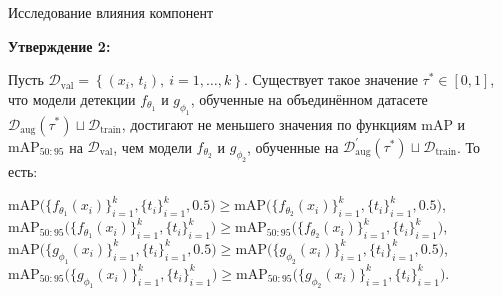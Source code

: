 \documentclass{beamer}
\begin{document}
\begin{frame}{Исследование влияния компонент}

\textbf{Утверждение 2:}\par

Пусть $\mathcal{D}_{\text{val}} =
\left\{
  (x_i,\,t_i), \
  i = 1,\dots,k
\right\}$. Существует такое значение $\tau^*\in[0,1]$, что модели детекции $f_{\theta_1}$ и $g_{\phi_1}$, обученные на объединённом датасете $\mathcal{D}_{\mathrm{aug}}(\tau^*)\sqcup\mathcal{D}_{\mathrm{train}}$, достигают не меньшего значения по функциям $\mathrm{mAP}$ и $\mathrm{mAP}_{50:95}$ на $\mathcal{D}_{\text{val}}$, чем модели $f_{\theta_2}$ и $g_{\phi_2}$, обученные на $\mathcal{D}^{'}_{\text{aug}}(\tau^{*}) \sqcup \mathcal{D}_{\text{train}}$. То есть:

\small{
\begin{center}
$\mathrm{mAP}\bigl(\{f_{\theta_1}(x_i)\}_{i=1}^k,\{t_i\}_{i=1}^k,0.5\bigr)\ge\mathrm{mAP}\bigl(\{f_{\theta_2}(x_i)\}_{i=1}^k,\{t_i\}_{i=1}^k,0.5\bigr)$,  
$\mathrm{mAP}_{50:95}\bigl(\{f_{\theta_1}(x_i)\}_{i=1}^k,\{t_i\}_{i=1}^k\bigr)\ge\mathrm{mAP}_{50:95}\bigl(\{f_{\theta_2}(x_i)\}_{i=1}^k,\{t_i\}_{i=1}^k\bigr)$,  
$\mathrm{mAP}\bigl(\{g_{\phi_1}(x_i)\}_{i=1}^k,\{t_i\}_{i=1}^k,0.5\bigr)\ge\mathrm{mAP}\bigl(\{g_{\phi_2}(x_i)\}_{i=1}^k,\{t_i\}_{i=1}^k,0.5\bigr)$,  
$\mathrm{mAP}_{50:95}\bigl(\{g_{\phi_1}(x_i)\}_{i=1}^k,\{t_i\}_{i=1}^k\bigr)\ge\mathrm{mAP}_{50:95}\bigl(\{g_{\phi_2}(x_i)\}_{i=1}^k,\{t_i\}_{i=1}^k\bigr)$.
\end{center}}

\end{frame}
\end{document}
